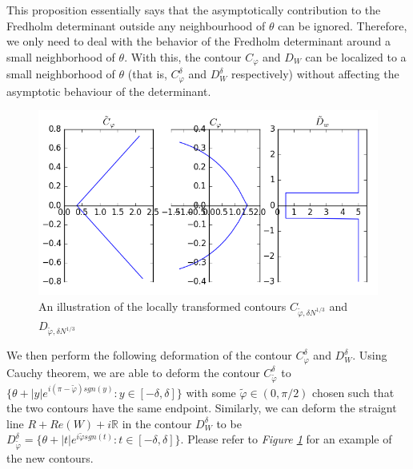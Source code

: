This proposition essentially says that the asymptotically contribution to the Fredholm determinant outside any neighbourhood of $\theta$ can be ignored. Therefore, we only need to deal with the behavior of the Fredholm determinant around a small neighborhood of $\theta$. With this, the contour $C_{\varphi}$ and $D_{W}$ can be localized to a small neighborhood of $\theta$ (that is, $C_{\varphi}^{\delta}$ and $D_{W}^{\delta}$ respectively) without affecting the asymptotic behaviour of the determinant.

\begin{figure}
	\centering
	\includegraphics[width=\textwidth]{contour-cphi}
	\caption[Contour localization and transformation of $C_{\varphi}$ and $D_W$]
	{An illustration of the locally transformed contours $C_{\tilde{\varphi},\delta N^{1/3}}$ and $D_{\tilde{\varphi}, \delta N^{1/3}}$}
	\label{fig:contour-second-replacement}
\end{figure}

We then perform the following deformation of the contour $C_{\varphi}^{\delta}$ and $D_W^{\delta}$. Using Cauchy theorem, we are able to deform the contour $C_{\tilde{\varphi}}^{\delta}$ to $\{\theta + |y|e^{i(\pi - \tilde{\varphi}) sgn(y)}: y \in [-\delta, \delta]\}$ with some $\tilde{\varphi} \in (0, \pi / 2)$ chosen such that the two contours have the same endpoint. Similarly, we can deform the straignt line $R+Re(W) + i \mathbb{R}$ in the contour $D_W^{\delta}$ to be $D_{\tilde{\varphi}}^{\delta} = \{\theta + |t| e^{i \tilde{\varphi} sgn(t)}: t \in [-\delta, \delta] \}$. Please refer to \textit{Figure \ref{fig:contour-second-replacement}} for an example of the new contours.

